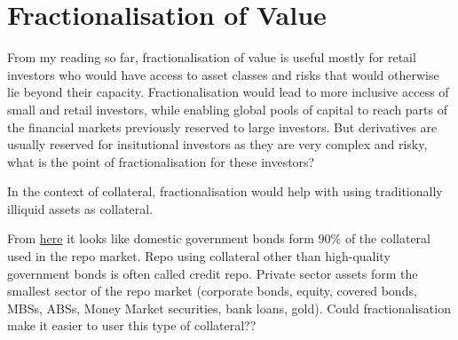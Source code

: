 \section{Fractionalisation of Value}
\label{sec:fractionalisation}
From my reading so far, fractionalisation of value is useful mostly for retail investors who would have access to asset classes and risks that would otherwise lie beyond their capacity. Fractionalisation would lead to more inclusive access of small and retail investors, while enabling global pools of capital to reach parts of the financial markets previously reserved to large investors. But derivatives are usually reserved for insitutional investors as they are very complex and risky, what is the point of fractionalisation for these investors?

In the context of collateral, fractionalisation would help with using traditionally illiquid assets as collateral.

From \href{https://www.icmagroup.org/market-practice-and-regulatory-policy/repo-and-collateral-markets/icma-ercc-publications/frequently-asked-questions-on-repo/6-what-types-of-asset-are-used-as-collateral-in-the-repo-market/}{here} it looks like domestic government bonds form 90\% of the collateral used in the repo market. Repo using collateral other than high-quality government bonds is often called credit repo. Private sector assets form the smallest sector of the repo market (corporate bonds, equity, covered bonds, MBSs, ABSs, Money Market securities, bank loans, gold). Could fractionalisation make it easier to user this type of collateral??